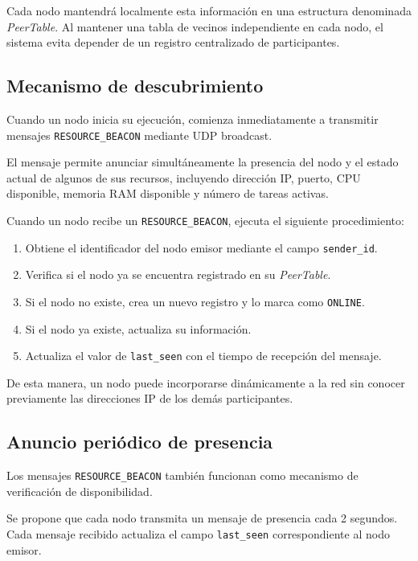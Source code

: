 \documentclass{article}
\begin{document}
Cada nodo mantendrá localmente esta información en una estructura denominada \textit{PeerTable}. Al mantener una tabla de vecinos independiente en cada nodo, el sistema evita depender de un registro centralizado de participantes.

\subsection{Mecanismo de descubrimiento}

Cuando un nodo inicia su ejecución, comienza inmediatamente a transmitir mensajes \texttt{RESOURCE\_BEACON} mediante UDP broadcast.

El mensaje permite anunciar simultáneamente la presencia del nodo y el estado actual de algunos de sus recursos, incluyendo dirección IP, puerto, CPU disponible, memoria RAM disponible y número de tareas activas.

Cuando un nodo recibe un \texttt{RESOURCE\_BEACON}, ejecuta el siguiente procedimiento:

\begin{enumerate}
    \item Obtiene el identificador del nodo emisor mediante el campo \texttt{sender\_id}.
    \item Verifica si el nodo ya se encuentra registrado en su \textit{PeerTable}.
    \item Si el nodo no existe, crea un nuevo registro y lo marca como \texttt{ONLINE}.
    \item Si el nodo ya existe, actualiza su información.
    \item Actualiza el valor de \texttt{last\_seen} con el tiempo de recepción del mensaje.
\end{enumerate}

De esta manera, un nodo puede incorporarse dinámicamente a la red sin conocer previamente las direcciones IP de los demás participantes.

\subsection{Anuncio periódico de presencia}

Los mensajes \texttt{RESOURCE\_BEACON} también funcionan como mecanismo de verificación de disponibilidad.

Se propone que cada nodo transmita un mensaje de presencia cada 2 segundos. Cada mensaje recibido actualiza el campo \texttt{last\_seen} correspondiente al nodo emisor.
\end{document}
